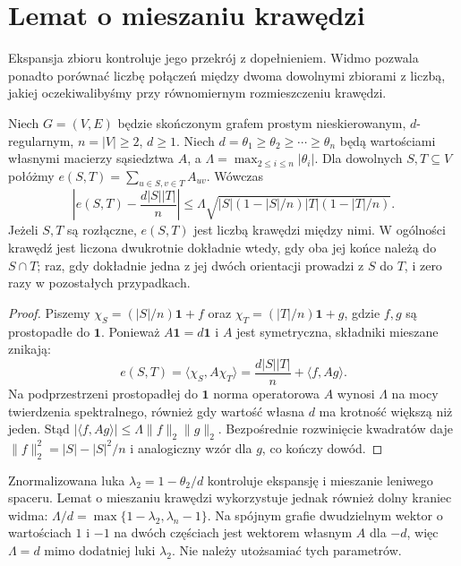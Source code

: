 \section{Lemat o mieszaniu krawędzi}
\label{sec:tg-expander-edge-mixing}

Ekspansja zbioru kontroluje jego przekrój z dopełnieniem.
Widmo pozwala ponadto porównać liczbę połączeń między
dwoma dowolnymi zbiorami z liczbą, jakiej oczekiwalibyśmy
przy równomiernym rozmieszczeniu krawędzi.

\begin{twierdzenie}
\label{thm:tg-expander-edge-mixing}
Niech $G=(V,E)$ będzie skończonym grafem prostym
nieskierowanym, $d$-regularnym, $n=|V|\geq2$, $d\geq1$.
Niech $d=\theta_1\geq\theta_2\geq\cdots\geq\theta_n$
będą wartościami własnymi macierzy sąsiedztwa $A$,
a $\Lambda=\max_{2\leq i\leq n}|\theta_i|$.
Dla dowolnych $S,T\subseteq V$ połóżmy
$e(S,T)=\sum_{u\in S,v\in T}A_{uv}$.
Wówczas
\[
\left|e(S,T)-\frac{d|S||T|}{n}\right|
\leq\Lambda
\sqrt{|S|(1-|S|/n)|T|(1-|T|/n)}.
\]
Jeżeli $S,T$ są rozłączne, $e(S,T)$ jest liczbą
krawędzi między nimi. W ogólności krawędź jest liczona
dwukrotnie dokładnie wtedy, gdy oba jej końce należą do
$S\cap T$; raz, gdy dokładnie jedna z jej dwóch orientacji
prowadzi z $S$ do $T$, i zero razy w pozostałych przypadkach.
\end{twierdzenie}
\begin{proof}
Piszemy $\chi_S=(|S|/n)\boldsymbol1+f$ oraz
$\chi_T=(|T|/n)\boldsymbol1+g$, gdzie
$f,g$ są prostopadłe do $\boldsymbol1$.
Ponieważ $A\boldsymbol1=d\boldsymbol1$ i $A$ jest
symetryczna, składniki mieszane znikają:
\[
e(S,T)=\langle\chi_S,A\chi_T\rangle
=\frac{d|S||T|}{n}+\langle f,Ag\rangle.
\]
Na podprzestrzeni prostopadłej do $\boldsymbol1$
norma operatorowa $A$ wynosi $\Lambda$ na mocy
twierdzenia spektralnego, również gdy wartość własna
$d$ ma krotność większą niż jeden.
Stąd $|\langle f,Ag\rangle|\leq\Lambda\|f\|_2\|g\|_2$.
Bezpośrednie rozwinięcie kwadratów daje
$\|f\|_2^2=|S|-|S|^2/n$ i analogiczny wzór dla $g$,
co kończy dowód.
\end{proof}

\begin{uwaga}
Znormalizowana luka $\lambda_2=1-\theta_2/d$
kontroluje ekspansję i mieszanie leniwego spaceru.
Lemat o mieszaniu krawędzi wykorzystuje jednak
również dolny kraniec widma: $\Lambda/d=
\max\{1-\lambda_2,\lambda_n-1\}$.
Na spójnym grafie dwudzielnym wektor o wartościach
$1$ i $-1$ na dwóch częściach jest wektorem własnym
$A$ dla $-d$, więc $\Lambda=d$ mimo dodatniej
luki $\lambda_2$. Nie należy utożsamiać tych parametrów.
\end{uwaga}

